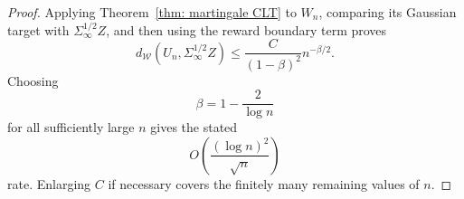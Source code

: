 \documentclass[10pt,a4paper]{article}
\begin{document}
\begin{proof}
Applying Theorem~\ref{thm: martingale CLT} to $W_n$, comparing its
Gaussian target with $\Sigma_\infty^{1/2}Z$, and then using the
reward boundary term proves
\[
d_{\mathcal W}(U_n,\Sigma_\infty^{1/2}Z)
\leq
\frac{C}{(1-\beta)^2}n^{-\beta/2}.
\]
Choosing
\[
\beta=1-\frac{2}{\log n}
\]
for all sufficiently large $n$ gives the stated
\[
O\left(\frac{(\log n)^2}{\sqrt n}\right)
\]
rate. Enlarging $C$ if necessary covers the finitely many remaining
values of $n$.
\end{proof}



\end{document}

